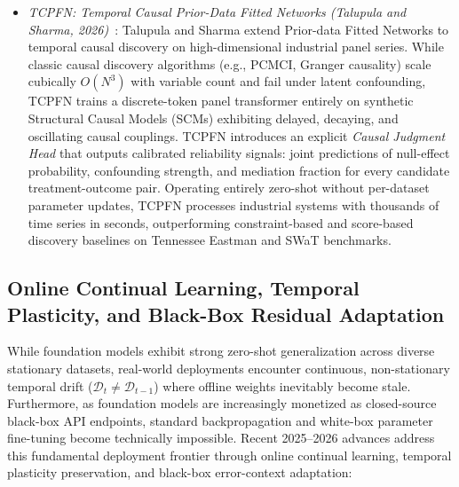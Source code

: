 \begin{itemize}[leftmargin=*]
    \item \emph{TCPFN: Temporal Causal Prior-Data Fitted Networks (Talupula and Sharma, 2026)}~\cite{talupula2026tcpfn}: Talupula and Sharma extend Prior-data Fitted Networks to temporal causal discovery on high-dimensional industrial panel series. While classic causal discovery algorithms (e.g., PCMCI, Granger causality) scale cubically $O(N^3)$ with variable count and fail under latent confounding, TCPFN trains a discrete-token panel transformer entirely on synthetic Structural Causal Models (SCMs) exhibiting delayed, decaying, and oscillating causal couplings. TCPFN introduces an explicit \emph{Causal Judgment Head} that outputs calibrated reliability signals: joint predictions of null-effect probability, confounding strength, and mediation fraction for every candidate treatment-outcome pair. Operating entirely zero-shot without per-dataset parameter updates, TCPFN processes industrial systems with thousands of time series in seconds, outperforming constraint-based and score-based discovery baselines on Tennessee Eastman and SWaT benchmarks.
\end{itemize}

\subsection{Online Continual Learning, Temporal Plasticity, and Black-Box Residual Adaptation}
\label{sec:online_continual_plasticity}

While foundation models exhibit strong zero-shot generalization across diverse stationary datasets, real-world deployments encounter continuous, non-stationary temporal drift ($\mathcal{D}_t \neq \mathcal{D}_{t-1}$) where offline weights inevitably become stale. Furthermore, as foundation models are increasingly monetized as closed-source black-box API endpoints, standard backpropagation and white-box parameter fine-tuning become technically impossible. Recent 2025--2026 advances address this fundamental deployment frontier through online continual learning, temporal plasticity preservation, and black-box error-context adaptation:

